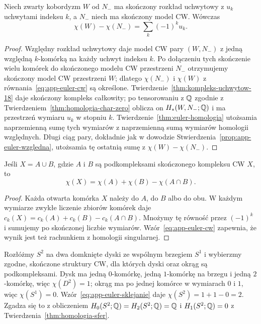 \begin{wniosek}
\label{cor:app-euler-uchwyty}
Niech zwarty kobordyzm $W$ od $N_-$ ma skończony rozkład uchwytowy
z $u_k$ uchwytami indeksu $k$, a $N_-$ niech ma skończony model CW.
Wówczas
\[
 \chi(W)-\chi(N_-)=\sum_k(-1)^k u_k.
\]
\end{wniosek}
\begin{proof}
Względny rozkład uchwytowy daje model CW pary
$(W,N_-)$ z jedną względną $k$-komórką na każdy
uchwyt indeksu $k$. Po dołączeniu tych skończenie wielu
komórek do skończonego modelu CW przestrzeni $N_-$
otrzymujemy skończony model CW przestrzeni $W$;
dlatego $\chi(N_-)$ i $\chi(W)$ z
równania~\eqref{eq:app-euler-cw} są określone.
Twierdzenie~\ref{thm:kompleks-uchwytow-18} daje skończony kompleks
całkowity; po tensorowaniu z $\mathbb{Q}$ zgodnie z
Twierdzeniem~\ref{thm:homologia-char-zero} oblicza on
$H_*(W,N_-;\mathbb{Q})$ i ma przestrzeń wymiaru $u_k$ w stopniu $k$.
Twierdzenie~\ref{thm:euler-homologia}
utożsamia naprzemienną sumę tych wymiarów z naprzemienną sumą
wymiarów homologii względnych. Długi ciąg pary, dokładnie jak
w dowodzie Stwierdzenia~\ref{prop:app-euler-wzgledna}, utożsamia
tę ostatnią sumę z $\chi(W)-\chi(N_-)$.
\end{proof}

\begin{stwierdzenie}
\label{prop:app-euler-addytywnosc}
Jeśli $X=A\cup B$, gdzie $A$ i $B$ są podkompleksami skończonego
kompleksu CW $X$, to
\begin{equation}\label{eq:app-euler-sklejanie}
 \chi(X)=\chi(A)+\chi(B)-\chi(A\cap B).
\end{equation}
\end{stwierdzenie}
\begin{proof}
Każda otwarta komórka $X$ należy do $A$, do $B$ albo do obu.
W każdym wymiarze zwykłe liczenie zbiorów komórek daje
$c_k(X)=c_k(A)+c_k(B)-c_k(A\cap B)$.
Mnożymy tę równość przez $(-1)^k$ i sumujemy po skończonej liczbie
wymiarów. Wzór~\eqref{eq:app-euler-cw} zapewnia, że wynik jest też
rachunkiem z homologii singularnej.
\end{proof}

\begin{przyklad}
Rozłóżmy $S^2$ na dwa domknięte dyski ze wspólnym brzegiem $S^1$
i wybierzmy zgodne, skończone struktury CW, dla których dyski oraz
okrąg są podkompleksami. Dysk ma jedną $0$-komórkę, jedną
$1$-komórkę na brzegu i jedną $2$-komórkę, więc $\chi(D^2)=1$;
okrąg ma po jednej komórce w wymiarach $0$ i $1$, więc
$\chi(S^1)=0$. Wzór~\eqref{eq:app-euler-sklejanie} daje
$\chi(S^2)=1+1-0=2$. Zgadza się to z obliczeniem
$H_0(S^2;\mathbb{Q})=H_2(S^2;\mathbb{Q})=\mathbb{Q}$ i $H_1(S^2;\mathbb{Q})=0$
z Twierdzenia~\ref{thm:homologia-sfer}.
\end{przyklad}

